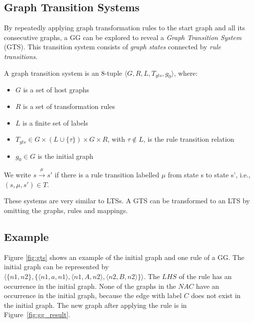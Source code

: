 \subsection{Graph Transition Systems}
By repeatedly applying graph transformation rules to the start graph and all its consecutive graphs, a GG can be explored to reveal a \textit{Graph Transition System} (GTS). This transition system consists of \textit{graph states} connected by \textit{rule transitions}.
\vspace{5px}
\begin{definition}
A graph transition system is an 8-tuple	$\langle G, R, L, T_{gts}, g_0\rangle$, where:
\begin{itemize}
\item $G$ is a set of host graphs
\item $R$ is a set of transformation rules
\item $L$ is a finite set of labels
\item $T_{gts} \in G \times (L \cup \{\tau\}) \times G \times R$, with $\tau \notin L$, is the rule transition relation
\item $g_0 \in G$ is the initial graph
\end{itemize}
We write $s \xrightarrow{\mu}s'$ if there is a rule transition labelled $\mu$ from state s to state s', i.e., $(s, \mu, s') \in T$.
\end{definition}

These systems are very similar to LTSs. A GTS can be transformed to an LTS by omitting the graphs, rules and mappings.

\subsection{Example}\label{sec:gts_example}
Figure \ref{fig:gts} shows an example of the initial graph and one rule of a GG. The initial graph can be represented by $\langle\{n1,n2\},\{\langle n1,a,n1\rangle, \langle n1,A,n2\rangle,\langle n2,B,n2\rangle\}\rangle$. The $\mathit{LHS}$ of the rule has an occurrence in the initial graph. None of the graphs in the $\mathit{NAC}$ have an occurrence in the initial graph, because the edge with label $C$ does not exist in the initial graph. The new graph after applying the rule is in Figure~\ref{fig:gg_result}.


